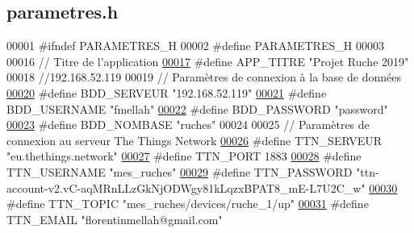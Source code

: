 \hypertarget{parametres_8h_source}{}\subsection{parametres.\+h}
\label{parametres_8h_source}

\begin{DoxyCode}
00001 \textcolor{preprocessor}{#ifndef PARAMETRES\_H}
00002 \textcolor{preprocessor}{#define PARAMETRES\_H}
00003 
00016 \textcolor{comment}{// Titre de l'application}
\hyperlink{parametres_8h_ace364d1ce44aa9f79bcff6e3752c4a5f}{00017} \textcolor{preprocessor}{#define APP\_TITRE       "Projet Ruche 2019"}
00018 \textcolor{comment}{//192.168.52.119}
00019 \textcolor{comment}{// Paramètres de connexion à la base de données}
\hyperlink{parametres_8h_a423559dc987673b8aacaa9f369839bb0}{00020} \textcolor{preprocessor}{#define BDD\_SERVEUR     "192.168.52.119"}
\hyperlink{parametres_8h_a88b5f5b81fa534553c68802384beff2c}{00021} \textcolor{preprocessor}{#define BDD\_USERNAME    "fmellah"}
\hyperlink{parametres_8h_ae2ded9166ed2553182545e97514c04f7}{00022} \textcolor{preprocessor}{#define BDD\_PASSWORD    "password"}
\hyperlink{parametres_8h_a45f8f15b8f9a7ab4c2b219038ff64f6b}{00023} \textcolor{preprocessor}{#define BDD\_NOMBASE     "ruches"}
00024 
00025 \textcolor{comment}{// Paramètres de connexion au serveur The Things Network}
\hyperlink{parametres_8h_a7ef65c771828d75412034ca6380f66c4}{00026} \textcolor{preprocessor}{#define TTN\_SERVEUR     "eu.thethings.network"}
\hyperlink{parametres_8h_abea0c88db594f8dc7bc483aaa71eedf4}{00027} \textcolor{preprocessor}{#define TTN\_PORT        1883}
\hyperlink{parametres_8h_af539766e9c089423c25dd4b7005b1563}{00028} \textcolor{preprocessor}{#define TTN\_USERNAME    "mes\_ruches"        }
\hyperlink{parametres_8h_a63e412d47c6b5d8189bcc70c32ace402}{00029} \textcolor{preprocessor}{#define TTN\_PASSWORD    "ttn-account-v2.vC-aqMRnLLzGkNjODWgy81kLqzxBPAT8\_mE-L7U2C\_w"}
\hyperlink{parametres_8h_a40e679ee59c74bda430a6c7498d7c21e}{00030} \textcolor{preprocessor}{#define TTN\_TOPIC       "mes\_ruches/devices/ruche\_1/up"}
\hyperlink{parametres_8h_a45133c820662f13b719dcc1729242e61}{00031} \textcolor{preprocessor}{#define TTN\_EMAIL       "florentinmellah@gmail.com"}

\end{DoxyCode}
